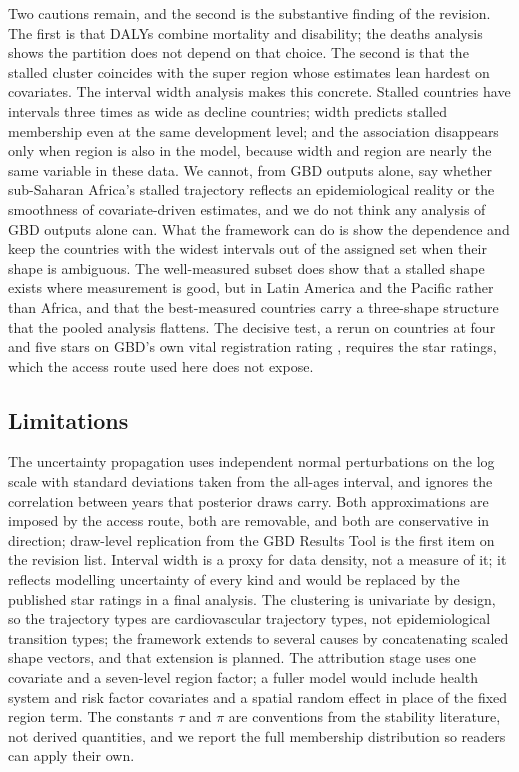 \documentclass[11pt,a4paper]{article}
\begin{document}
Two cautions remain, and the second is the substantive finding of the revision. The first is that DALYs combine mortality and disability; the deaths analysis shows the partition does not depend on that choice. The second is that the stalled cluster coincides with the super region whose estimates lean hardest on covariates. The interval width analysis makes this concrete. Stalled countries have intervals three times as wide as decline countries; width predicts stalled membership even at the same development level; and the association disappears only when region is also in the model, because width and region are nearly the same variable in these data. We cannot, from GBD outputs alone, say whether sub-Saharan Africa's stalled trajectory reflects an epidemiological reality or the smoothness of covariate-driven estimates, and we do not think any analysis of GBD outputs alone can. What the framework can do is show the dependence and keep the countries with the widest intervals out of the assigned set when their shape is ambiguous. The well-measured subset does show that a stalled shape exists where measurement is good, but in Latin America and the Pacific rather than Africa, and that the best-measured countries carry a three-shape structure that the pooled analysis flattens. The decisive test, a rerun on countries at four and five stars on GBD's own vital registration rating \citep{gbd2016cod,gbd2023cod}, requires the star ratings, which the access route used here does not expose.

\subsection{Limitations}

The uncertainty propagation uses independent normal perturbations on the log scale with standard deviations taken from the all-ages interval, and ignores the correlation between years that posterior draws carry. Both approximations are imposed by the access route, both are removable, and both are conservative in direction; draw-level replication from the GBD Results Tool is the first item on the revision list. Interval width is a proxy for data density, not a measure of it; it reflects modelling uncertainty of every kind and would be replaced by the published star ratings in a final analysis. The clustering is univariate by design, so the trajectory types are cardiovascular trajectory types, not epidemiological transition types; the framework extends to several causes by concatenating scaled shape vectors, and that extension is planned. The attribution stage uses one covariate and a seven-level region factor; a fuller model would include health system and risk factor covariates and a spatial random effect in place of the fixed region term. The constants $\tau$ and $\pi$ are conventions from the stability literature, not derived quantities, and we report the full membership distribution so readers can apply their own.
\end{document}
